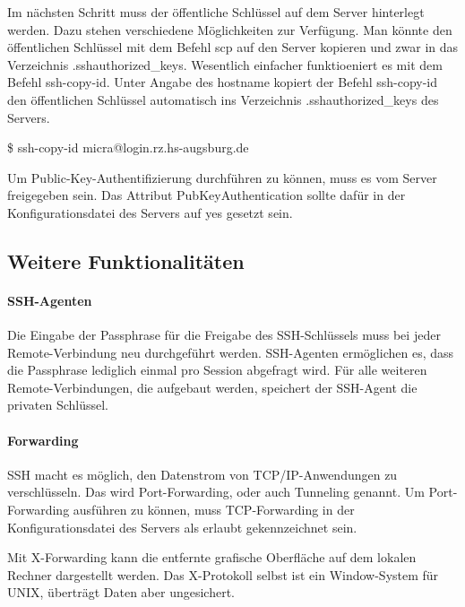 \documentclass[ngerman,pdf]{wkcms}    %
\begin{document}
Im nächsten Schritt muss der öffentliche Schlüssel auf dem Server hinterlegt werden. Dazu stehen verschiedene Möglichkeiten zur Verfügung. Man könnte den öffentlichen Schlüssel mit dem Befehl \IT scp auf den Server kopieren und zwar in das Verzeichnis \IT .ssh\/authorized\_keys. Wesentlich einfacher funktioeniert es mit dem Befehl \IT ssh-copy-id. Unter Angabe des \IT hostname kopiert der Befehl \IT ssh-copy-id den öffentlichen Schlüssel automatisch ins Verzeichnis \IT .ssh\/authorized\_keys des Servers.

\begin{program}
\$ ssh-copy-id micra@login.rz.hs-augsburg.de
\end{program}

Um Public-Key-Authentifizierung durchführen zu können, muss es vom Server freigegeben sein. Das Attribut \IT PubKeyAuthentication sollte dafür in der Konfigurationsdatei des Servers auf \IT yes gesetzt sein. \cite [S. 116]{openssh_book}

\subsection{Weitere Funktionalitäten}

\paragraph{SSH-Agenten}
Die Eingabe der Passphrase für die Freigabe des SSH-Schlüssels muss bei jeder Remote-Verbindung neu durchgeführt werden. SSH-Agenten ermöglichen es,
dass die Passphrase lediglich einmal pro Session abgefragt wird. Für alle weiteren Remote-Verbindungen, die aufgebaut werden, speichert der SSH-Agent die privaten Schlüssel. \cite[S. 230]{SSH} \cite[S. 132]{openssh_book}

\paragraph{Forwarding}

SSH macht es möglich, den Datenstrom von TCP/IP-Anwendungen zu verschlüsseln.
Das wird \IT Port-Forwarding, oder auch \IT Tunneling genannt. \cite[S. 337]{SSH} Um Port-Forwarding ausführen zu können, muss TCP-Forwarding in der Konfigurationsdatei des Servers als erlaubt gekennzeichnet sein. \cite[S. 151]{openssh_book}

Mit \IT X-Forwarding kann die entfernte grafische Oberfläche auf dem lokalen Rechner dargestellt werden. Das X-Protokoll selbst ist ein Window-System für UNIX, überträgt Daten aber ungesichert.
\end{document}
